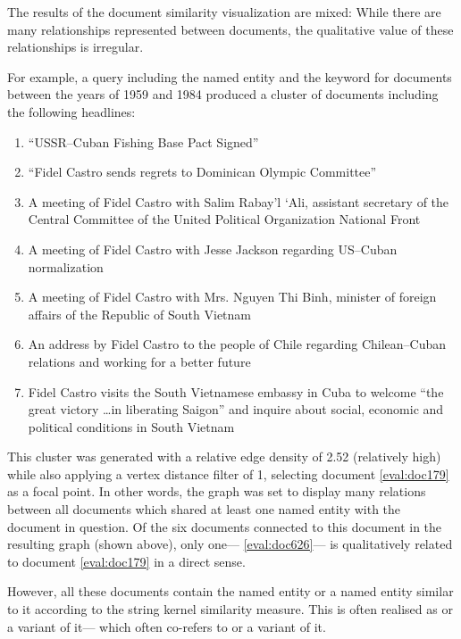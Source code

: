 The results of the document similarity visualization are mixed: While there are many relationships represented between documents, the qualitative value of these relationships is irregular.

For example, a query including the named entity  and the keyword  for documents between the years of 1959 and 1984 produced a cluster of documents including the following headlines:

\begin{enumerate}
\item ``USSR--Cuban Fishing Base Pact Signed''\label{eval:doc179}
\item ``Fidel Castro sends regrets to Dominican Olympic Committee''\label{eval:doc553}
\item A meeting of Fidel Castro with Salim Rabay'l `Ali, assistant secretary of the Central Committee of the United Political Organization National Front\label{eval:doc682}
\item A meeting of Fidel Castro with Jesse Jackson regarding US--Cuban normalization\label{eval:doc879}
\item A meeting of Fidel Castro with Mrs. Nguyen Thi Binh, minister of foreign affairs of the Republic of South Vietnam\label{eval:doc643}
\item An address by Fidel Castro to the people of Chile regarding Chilean--Cuban relations and working for a better future\label{eval:doc391}
\item Fidel Castro visits the South Vietnamese embassy in Cuba to welcome ``the great victory \ldots in liberating Saigon'' and inquire about social, economic and political conditions in South Vietnam\label{eval:doc626}
\end{enumerate} 

This cluster was generated with a relative edge density of 2.52 (relatively high) while also applying a vertex distance filter of 1, selecting document \ref{eval:doc179} as a focal point. In other words, the graph was set to display many relations between all documents which shared at least one named entity with the document in question. Of the six documents connected to this document in the resulting graph (shown above), only one--- \ref{eval:doc626}--- is qualitatively related to document \ref{eval:doc179} in a direct sense.

However, all these documents contain the named entity  or a named entity similar to it according to the string kernel similarity measure. This is often realised as  or a variant of it--- which often co-refers to  or a variant of it.

